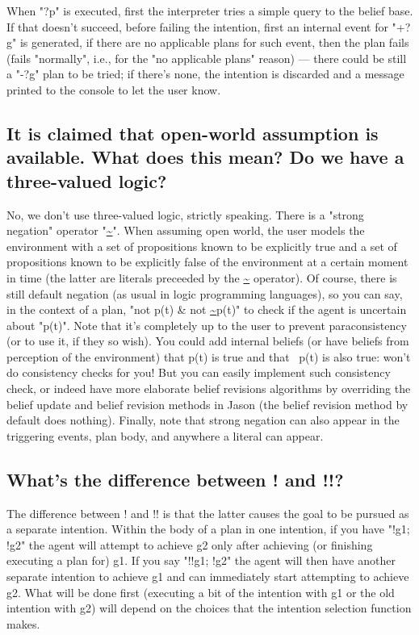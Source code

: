 \documentclass{article}
\newcommand{\jason}[0]{\htlink{\textit{Jason}}{http://jason.sf.net}\xspace}
\begin{document}
\begin{description}
When "?p" is executed, first the interpreter tries a simple query to
the belief base. If that doesn't succeed, before failing the
intention, first an internal event for "+?g" is generated, if there
are no applicable plans for such event, then the plan fails (fails
"normally", i.e., for the "no applicable plans" reason) --- there
could be still a "-?g" plan to be tried; if there's none, the
intention is discarded and a message printed to the console to let the
user know.

\subsection{It is claimed that open-world assumption is available. What
does this mean? Do we have a three-valued logic?}

No, we don't use three-valued logic, strictly speaking. There is a
"strong negation" operator "\url{~}". When assuming open world, the
user models the environment with a set of propositions known to be
explicitly true and a set of propositions known to be explicitly false
of the environment at a certain moment in time (the latter are
literals preceeded by the \url{~} operator).  Of course, there is
still default negation (as usual in logic programming languages), so
you can say, in the context of a plan, "not p(t) \& not \url{~}p(t)"
to check if the agent is uncertain about "p(t)". Note that it's
completely up to the user to prevent paraconsistency (or to use it, if
they so wish). You could add internal beliefs (or have beliefs from
perception of the environment) that p(t) is true and that ~p(t) is
also true: \jason won't do consistency checks for you! But you can
easily implement such consistency check, or indeed have more elaborate
belief revisions algorithms by overriding the belief update and belief
revision methods in Jason (the belief revision method by default does
nothing). Finally, note that strong negation can also appear in the
triggering events, plan body, and anywhere a literal can appear.


\subsection{What's the difference between ! and !!?}

The difference between ! and !! is that the latter causes the goal to
be pursued as a separate intention. Within the body of a plan in one
intention, if you have "!g1; !g2" the agent will attempt to achieve g2
only after achieving (or finishing executing a plan for) g1.  If you
say "!!g1; !g2" the agent will then have another separate intention to
achieve g1 and can immediately start attempting to achieve g2. What
will be done first (executing a bit of the intention with g1 or the
old intention with g2) will depend on the choices that the intention
selection function makes. 


\end{description}
\end{document}

